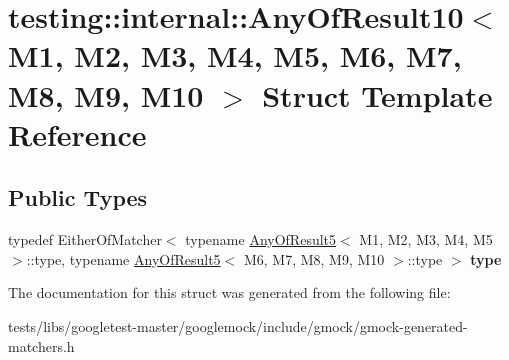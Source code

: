 \hypertarget{structtesting_1_1internal_1_1AnyOfResult10}{}\section{testing\+:\+:internal\+:\+:Any\+Of\+Result10$<$ M1, M2, M3, M4, M5, M6, M7, M8, M9, M10 $>$ Struct Template Reference}
\label{structtesting_1_1internal_1_1AnyOfResult10}
\subsection*{Public Types}
\begin{DoxyCompactItemize}
\item 
\mbox{\label{structtesting_1_1internal_1_1AnyOfResult10_aa1cb3d733f29716f2015db8a2b6c1c94}} 
typedef Either\+Of\+Matcher$<$ typename \hyperlink{structtesting_1_1internal_1_1AnyOfResult5}{Any\+Of\+Result5}$<$ M1, M2, M3, M4, M5 $>$\+::type, typename \hyperlink{structtesting_1_1internal_1_1AnyOfResult5}{Any\+Of\+Result5}$<$ M6, M7, M8, M9, M10 $>$\+::type $>$ {\bfseries type}
\end{DoxyCompactItemize}


The documentation for this struct was generated from the following file\+:\begin{DoxyCompactItemize}
\item 
tests/libs/googletest-\/master/googlemock/include/gmock/gmock-\/generated-\/matchers.\+h\end{DoxyCompactItemize}

